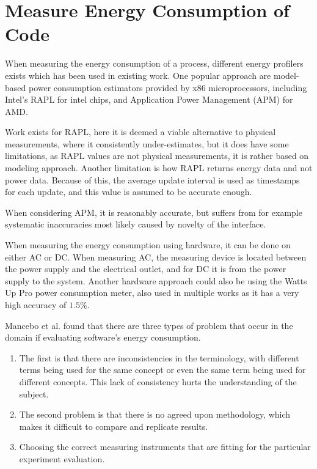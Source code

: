 
\section{Measure Energy Consumption of Code}

When measuring the energy consumption of a process, different energy profilers exists which has been used in existing work. One popular approach are model-based power consumption estimators provided by x86 microprocessors, including Intel's RAPL for intel chips, and Application Power Management (APM) for AMD.

Work exists for RAPL, here it is deemed a viable alternative to physical measurements, where it consistently under-estimates\cite[]{Dongarra2012, Hackenberg2013}, but it does have some limitations, as RAPL values are not physical measurements, it is rather based on modeling approach\cite[]{Hackenberg2013}. Another limitation is how RAPL returns energy data and not power data. Because of this, the average update interval is used as timestamps for each update, and this value is assumed to be accurate enough.\cite[]{Hackenberg2013}

When considering APM, it is reasonably accurate, but suffers from for example systematic inaccuracies most likely caused by novelty of the interface.\cite[]{Hackenberg2013}


When measuring the energy consumption using hardware, it can be done on either AC or DC. When measuring AC, the measuring device is located between the power supply and the electrical outlet, and for DC it is from the power supply to the system.\cite[]{Hackenberg2013} Another hardware approach could also be using the Watts Up Pro power consumption meter, also used in multiple works as it has a very high accuracy of $1.5\%$.\cite[]{Jagroep2015}




Mancebo et al. found that there are three types of problem that occur in the domain if evaluating software's energy consumption.\cite{MANCEBO2021100558} 
\begin{enumerate}
    \item The first is that there are inconsistencies in the terminology, with different terms being used for the same concept or even the same term being used for different concepts. This lack of consistency hurts the understanding of the subject.
    \item The second problem is that there is no agreed upon methodology, which makes it difficult to compare and replicate results.
    \item Choosing the correct measuring instruments that are fitting for the particular experiment evaluation.
\end{enumerate}

